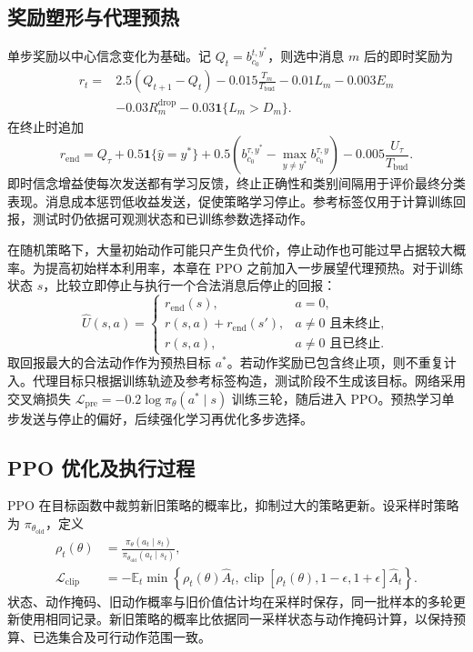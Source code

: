 \subsection{奖励塑形与代理预热}
单步奖励以中心信念变化为基础。记 $Q_t=b_{c_0}^{t,y^*}$，则选中消息 $m$ 后的即时奖励为
\begin{equation}
\begin{aligned}
r_t={}&2.5(Q_{t+1}-Q_t)-0.015\frac{T_m}{T_{\mathrm{bud}}}
-0.01L_m-0.003E_m\\
&-0.03R_m^{\mathrm{drop}}-0.03\mathbf1\{L_m>D_m\}.
\end{aligned}
\label{rq2:eq:reward}
\end{equation}
在终止时追加
\begin{equation}
r_{\mathrm{end}}=Q_{\tau}+0.5\mathbf1\{\hat y=y^*\}
+0.5\left(b_{c_0}^{\tau,y^*}-\max_{y\ne y^*}b_{c_0}^{\tau,y}\right)
-0.005\frac{U_{\tau}}{T_{\mathrm{bud}}}.
\label{rq2:eq:terminal}
\end{equation}
即时信念增益使每次发送都有学习反馈，终止正确性和类别间隔用于评价最终分类表现。消息成本惩罚低收益发送，促使策略学习停止。参考标签仅用于计算训练回报，测试时仍依据可观测状态和已训练参数选择动作。

在随机策略下，大量初始动作可能只产生负代价，停止动作也可能过早占据较大概率。为提高初始样本利用率，本章在 PPO 之前加入一步展望代理预热。对于训练状态 $s$，比较立即停止与执行一个合法消息后停止的回报：
\begin{equation}
\widehat U(s,a)=
\begin{cases}
r_{\mathrm{end}}(s),&a=0,\\
r(s,a)+r_{\mathrm{end}}(s'),&a\ne0\text{ 且未终止},\\
r(s,a),&a\ne0\text{ 且已终止}.
\end{cases}
\label{rq2:eq:proxy}
\end{equation}
取回报最大的合法动作作为预热目标 $a^*$。若动作奖励已包含终止项，则不重复计入。代理目标只根据训练轨迹及参考标签构造，测试阶段不生成该目标。网络采用交叉熵损失 $\mathcal L_{\mathrm{pre}}=-0.2\log\pi_\theta(a^*\mid s)$ 训练三轮，随后进入 PPO。预热学习单步发送与停止的偏好，后续强化学习再优化多步选择。

\subsection{PPO 优化及执行过程}
PPO 在目标函数中裁剪新旧策略的概率比，抑制过大的策略更新\cite{ppo}。设采样时策略为 $\pi_{\theta_{\mathrm{old}}}$，定义
\begin{equation}
\begin{aligned}
\rho_t(\theta)&=\frac{\pi_\theta(a_t\mid s_t)}{\pi_{\theta_{\mathrm{old}}}(a_t\mid s_t)},\\
\mathcal L_{\mathrm{clip}}&=
-\mathbb E_t\min\left\{\rho_t(\theta)\widehat A_t,
\operatorname{clip}[\rho_t(\theta),1-\epsilon,1+\epsilon]\widehat A_t\right\}.
\end{aligned}
\label{rq2:eq:ppo}
\end{equation}
状态、动作掩码、旧动作概率与旧价值估计均在采样时保存，同一批样本的多轮更新使用相同记录。新旧策略的概率比依据同一采样状态与动作掩码计算，以保持预算、已选集合及可行动作范围一致。

